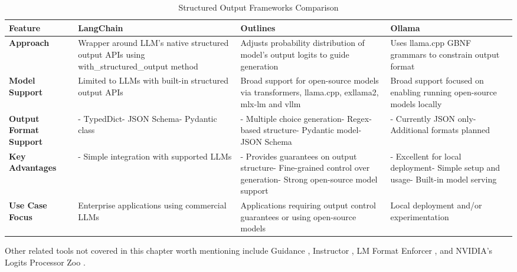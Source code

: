 \begin{table*}[h]
\caption{Structured Output Frameworks Comparison}
\label{structured_output_frameworks}
\begin{tabular}{|p{}|p{}|p{}|p{}|}
\hline
\textbf{Feature} & \textbf{LangChain} & \textbf{Outlines} & \textbf{Ollama} \\
\hline
\textbf{Approach} & Wrapper around LLM's native structured output APIs using with\_structured\_output method & Adjusts probability distribution of model's output logits to guide generation & Uses llama.cpp GBNF grammars to constrain output format \\
\hline
\textbf{Model Support} & Limited to LLMs with built-in structured output APIs & Broad support for open-source models via transformers, llama.cpp, exllama2, mlx-lm and vllm & Broad support focused on enabling running open-source models locally \\
\hline
\textbf{Output Format Support} & - TypedDict\newline - JSON Schema\newline - Pydantic class & - Multiple choice generation\newline - Regex-based structure\newline - Pydantic model\newline - JSON Schema & - Currently JSON only\newline - Additional formats planned \\
\hline
\textbf{Key Advantages} & - Simple integration with supported LLMs & - Provides guarantees on output structure\newline - Fine-grained control over generation\newline - Strong open-source model support & - Excellent for local deployment\newline - Simple setup and usage\newline - Built-in model serving \\
\hline
\textbf{Use Case Focus} & Enterprise applications using commercial LLMs & Applications requiring output control guarantees or using open-source models & Local deployment and/or experimentation \\
\hline
\end{tabular}
\end{table*}

Other related tools not covered in this chapter worth mentioning include Guidance \cite{guidance2024repo}, Instructor \cite{instructorgithub}, LM Format Enforcer \cite{lmformatenforcergithub}, and NVIDIA's Logits Processor Zoo \cite{nvidia2024logitsprocessorzoo}.

